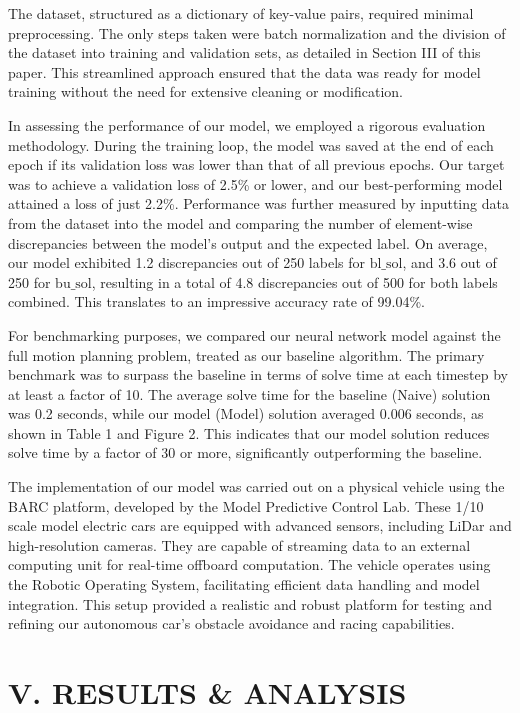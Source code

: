 \documentclass[
	letterpaper, %
	10pt, %
	unnumberedsections, %
	twoside, %
]{LTJournalArticle}
\begin{document}
The dataset, structured as a dictionary of key-value pairs, required minimal preprocessing. The only steps taken were batch normalization and the division of the dataset into training and validation sets, as detailed in Section III of this paper. This streamlined approach ensured that the data was ready for model training without the need for extensive cleaning or modification.

In assessing the performance of our model, we employed a rigorous evaluation methodology. During the training loop, the model was saved at the end of each epoch if its validation loss was lower than that of all previous epochs. Our target was to achieve a validation loss of 2.5\% or lower, and our best-performing model attained a loss of just 2.2\%. Performance was further measured by inputting data from the dataset into the model and comparing the number of element-wise discrepancies between the model’s output and the expected label. On average, our model exhibited 1.2 discrepancies out of 250 labels for $\text{bl\_sol}$, and 3.6 out of 250 for $\text{bu\_sol}$, resulting in a total of 4.8 discrepancies out of 500 for both labels combined. This translates to an impressive accuracy rate of 99.04\%.

For benchmarking purposes, we compared our neural network model against the full motion planning problem, treated as our baseline algorithm. The primary benchmark was to surpass the baseline in terms of solve time at each timestep by at least a factor of 10. The average solve time for the baseline (Naive) solution was 0.2 seconds, while our model (Model) solution averaged 0.006 seconds, as shown in Table 1 and Figure 2. This indicates that our model solution reduces solve time by a factor of 30 or more, significantly outperforming the baseline.

The implementation of our model was carried out on a physical vehicle using the BARC platform, developed by the Model Predictive Control Lab. These 1/10 scale model electric cars are equipped with advanced sensors, including LiDar and high-resolution cameras. They are capable of streaming data to an external computing unit for real-time offboard computation. The vehicle operates using the Robotic Operating System, facilitating efficient data handling and model integration. This setup provided a realistic and robust platform for testing and refining our autonomous car's obstacle avoidance and racing capabilities.

\section{V. RESULTS \& ANALYSIS}
\end{document}
